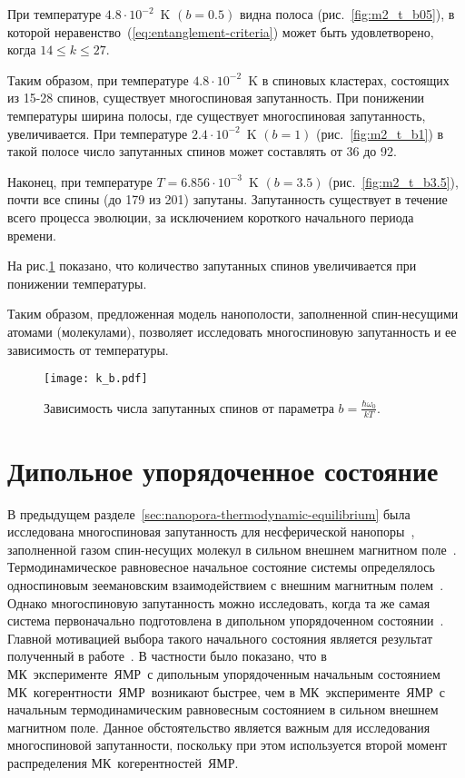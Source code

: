 При температуре ${4.8\cdot10^{-2}}$~K $(b=0.5)$ видна полоса (рис.~\ref{fig:m2_t_b05}), в которой неравенство~(\ref{eq:entanglement-criteria}) может быть удовлетворено, когда $14 \leq k \leq 27$.

Таким образом, при температуре ${4.8\cdot10^{-2}}$~K в спиновых кластерах, состоящих из 15-28 спинов, существует многоспиновая запутанность. При понижении температуры ширина полосы, где существует многоспиновая запутанность, увеличивается. При температуре ${2.4\cdot10^{-2}}$~K $(b=1)$ (рис.~\ref{fig:m2_t_b1}) в такой полосе число запутанных спинов может составлять от 36 до 92.

Наконец, при температуре ${T= 6.856\cdot10^{-3}}$~K $(b=3.5)$ (рис.~\ref{fig:m2_t_b3.5}), почти все спины (до 179 из 201) запутаны. Запутанность существует в течение всего процесса эволюции, за исключением короткого начального периода времени.

На рис.\ref{fig:k_b} показано, что количество запутанных спинов увеличивается при понижении температуры.


Таким образом, предложенная модель нанополости, заполненной спин-несущими атомами (молекулами), позволяет исследовать многоспиновую запутанность и ее зависимость от температуры.

\begin{figure}[H]
  \centering
  \texttt{[image: k\_b.pdf]}
  \caption{Зависимость числа запутанных спинов от параметра  $b = \frac{\hbar\omega_0}{kT} $.}
  \label{fig:k_b}
\end{figure}



\section{Дипольное упорядоченное состояние}
\label{sec:1}

В предыдущем разделе~\ref{sec:nanopora-thermodynamic-equilibrium} была исследована многоспиновая запутанность для несферической нанопоры~\cite{Doronin2019},
заполненной газом  спин-несущих молекул в сильном внешнем магнитном поле~\cite{Baugh2001,Doronin2009}.
Термодинамическое равновесное начальное состояние системы определялось односпиновым зеемановским взаимодействием с внешним магнитным полем~\cite{Doronin2007a}.
Однако  многоспиновую запутанность можно  исследовать,
когда та же самая система первоначально подготовлена в дипольном упорядоченном состоянии~\cite{Goldman1970}.
Главной мотивацией выбора такого начального состояния является результат полученный в работе~\cite{Doronin2011}.
В частности было показано, что в МК~эксперименте~ЯМР~с дипольным упорядоченным начальным состоянием МК~когерентности~ЯМР~возникают быстрее,
чем в МК~эксперименте~ЯМР~с начальным термодинамическим равновесным состоянием в сильном внешнем магнитном поле.
Данное обстоятельство является важным для исследования многоспиновой запутанности,
поскольку при этом используется второй момент распределения МК~когерентностей~ЯМР.

